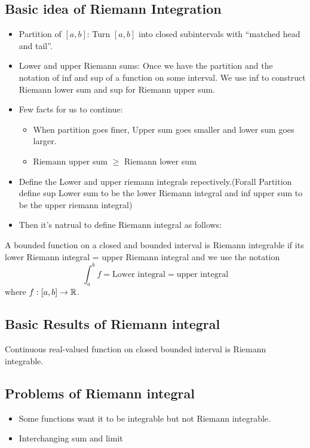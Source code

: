 \documentclass[11pt]{article}
\begin{document}
\subsection{Basic idea of Riemann Integration}
\label{sec:orge1b29eb}
\begin{itemize}
\item Partition of \([a,b]\): Turn \([a,b]\) into closed subintervals with ``matched head and tail''.

\item Lower and upper Riemann sums: Once we have the partition and the notation of inf and sup of a function on some interval. We use inf to construct Riemann lower sum and sup for Riemann upper sum.

\item Few facts for us to continue:
\begin{itemize}
\item When partition goes finer, Upper sum goes smaller and lower sum goes larger.
\item Riemann upper sum \(\geq\) Riemann lower sum
\end{itemize}

\item Define the Lower and upper riemann integrals repectively.(Forall Partition define sup Lower sum to be the lower Riemann integral and inf upper sum to be the upper riemann integral)

\item Then it's natrual to define Riemann integral as follows:
\end{itemize}

\begin{definition}
A bounded function on a closed and bounded interval is Riemann integrable if its lower Riemann integral = upper Riemann integral and we use the notation
\[
\int^b_a f = \text{Lower integral} = \text{upper integral}
\]
where \(f:[a,b] \to \mathbb{R}\).
\end{definition}
\subsection{Basic Results of Riemann integral}
\label{sec:org842b607}
\begin{proposition}[ ]
Continuous real-valued function on closed bounded interval is Riemann integrable.
\end{proposition}
\subsection{Problems of Riemann integral}
\label{sec:org343bb29}
\begin{itemize}
\item Some functions want it to be integrable but not Riemann integrable.
\item Interchanging sum and limit
\end{itemize}
\end{document}
